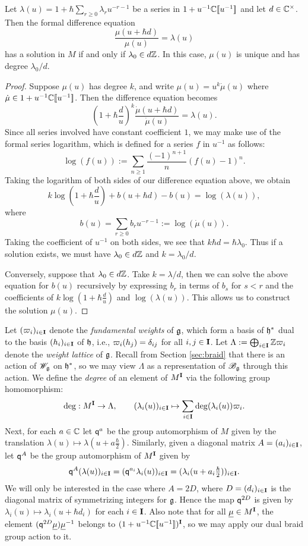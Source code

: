 \begin{lemma}\label{L:diff-eqn}
    Let $\lambda(u) = 1+\hbar\sum_{r\geq 0}\lambda_ru^{-r-1}$ be a series in $1+u^{-1}\mathbb{C}[\![u^{-1}]\!]$ and let $d\in\mathbb{C}^\times$.
    Then the formal difference equation
    \[\frac{\mu(u+\hbar d)}{\mu(u)} = \lambda(u)\]
    has a solution in $M$ if and only if $\lambda_0\in d\mathbb{Z}$.
    In this case, $\mu(u)$ is unique and has degree $\lambda_0/d$.
\end{lemma}
\begin{proof}
    Suppose $\mu(u)$ has degree $k$, and write $\mu(u)=u^k\dot{\mu}(u)$ where $\dot{\mu}\in 1+u^{-1}\mathbb{C}[\![u^{-1}]\!]$.
    Then the difference equation becomes
    \[\left(1+\hbar\frac{d}{u}\right)^k \frac{\dot{\mu}(u+\hbar d)}{\dot{\mu}(u)} = \lambda(u).\]
    Since all series involved have constant coefficient $1$, we may make use of the formal series logarithm, which is defined for a series $f$ in $u^{-1}$ as follows:
    \[\log(f(u)) := \sum_{n\geq 1}\frac{(-1)^{n+1}}{n}(f(u)-1)^n.\]
    Taking the logarithm of both sides of our difference equation above, we obtain
    \[k\log(1+\hbar\frac{d}{u}) + b(u+\hbar d) - b(u) = \log(\lambda(u)),\]
    where
    \[b(u) = \sum_{r\geq 0}b_ru^{-r-1} := \log(\dot{\mu}(u)).\]
    Taking the coefficient of $u^{-1}$ on both sides, we see that $k\hbar d = \hbar\lambda_0$.
    Thus if a solution exists, we must have $\lambda_0\in d\mathbb{Z}$ and $k = \lambda_0/d$.

    Conversely, suppose that $\lambda_0\in d\mathbb{Z}$.
    Take $k = \lambda/d$, then we can solve the above equation for $b(u)$ recursively by expressing $b_{r}$ in terms of $b_s$ for $s<r$ and the coefficients of $k\log(1+\hbar\frac{d}{u})$ and $\log(\lambda(u))$.
    This allows us to construct the solution $\mu(u)$.
\end{proof}

Let $(\varpi_i)_{i\in\mathbf{I}}$ denote the \emph{fundamental weights} of $\mathfrak{g}$, which form a basis of $\mathfrak{h}^*$ dual to the basis $(h_i)_{i\in\mathbf{I}}$ of $\mathfrak{h}$, i.e., $\varpi_i(h_j) = \delta_{ij}$ for all $i,j\in\mathbf{I}$.
Let $\Lambda := \bigoplus_{i\in\mathbf{I}}\mathbb{Z}\varpi_i$ denote the \emph{weight lattice} of $\mathfrak{g}$.
Recall from Section \ref{sec:braid} that there is an action of $\mathscr{W}_{\mathfrak{g}}$ on $\mathfrak{h}^*$, so we may view $\Lambda$ as a representation of $\mathscr{B}_{\mathfrak{g}}$ through this action.
We define the \emph{degree} of an element of $M^{\mathbf{I}}$ via the following group homomorphism:
\[\deg:M^{\mathbf{I}}\to\Lambda, \qquad (\lambda_i(u))_{i\in\mathbf{I}}\mapsto\sum_{i\in\mathbf{I}}\deg(\lambda_i(u))\varpi_i.\]
Next, for each $a\in\mathbb{C}$ let $\mathsf{q}^a$ be the group automorphism of $M$ given by the translation $\lambda(u)\mapsto\lambda(u+a\frac{\hbar}{2})$.
Similarly, given a diagonal matrix $A = (a_i)_{i\in\mathbf{I}}$, let $\mathsf{q}^A$ be the group automorphism of $M^{\mathbf{I}}$ given by
\[\mathsf{q}^A(\lambda(u))_{i\in\mathbf{I}} = (\mathsf{q}^{a_i}\lambda_i(u))_{i\in\mathbf{I}} = (\lambda_i(u+a_i\tfrac{\hbar}{2}))_{i\in\mathbf{I}}.\]
We will only be interested in the case where $A = 2D$, where $D = (d_i)_{i\in\mathbf{I}}$ is the diagonal matrix of symmetrizing integers for $\mathfrak{g}$.
Hence the map $\mathsf{q}^{2D}$ is given by $\lambda_i(u)\mapsto\lambda_i(u+\hbar d_i)$ for each $i\in\mathbf{I}$.
Also note that for all $\underline{\mu}\in M^{\mathbf{I}}$, the element $(\mathsf{q}^{2D}\underline{\mu})\underline{\mu}^{-1}$ belongs to $(1+u^{-1}\mathbb{C}[\![u^{-1}]\!])^{\mathbf{I}}$, so we may apply our dual braid group action to it.

